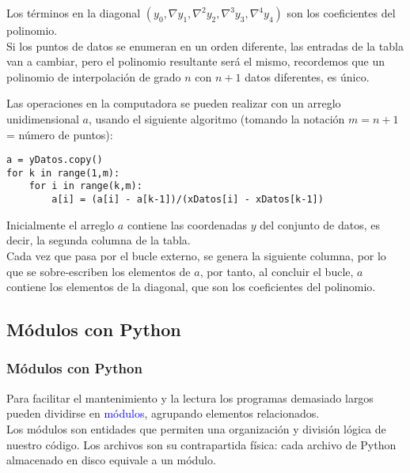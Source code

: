 \begin{frame}
Los términos en la diagonal $(y_{0}, \nabla y_{1}, \nabla^{2} y_{2}, \nabla^{3} y_{3}, \nabla^{4} y_{4})$ son los coeficientes del polinomio.
\\
\medskip
Si los puntos de datos se enumeran en un orden diferente, las entradas de la tabla van a cambiar, pero el polinomio resultante será el mismo, recordemos que un polinomio de interpolación de grado $n$ con $n + 1$ datos diferentes, es único.
\end{frame}
\begin{frame}[fragile]
Las operaciones en la computadora se pueden realizar con un arreglo unidimensional $a$, usando el siguiente algoritmo (tomando la notación $m = n + 1$ = número de puntos):
\\
\medskip
\begin{lstlisting}
a = yDatos.copy()
for k in range(1,m):
    for i in range(k,m):
        a[i] = (a[i] - a[k-1])/(xDatos[i] - xDatos[k-1])
\end{lstlisting}
\end{frame}
\begin{frame}
Inicialmente el arreglo $a$ contiene las coordenadas $y$ del conjunto de datos, es decir, la segunda columna de la tabla.
\\
\medskip
Cada vez que pasa por el bucle externo, se genera la siguiente columna, por lo que se sobre-escriben los elementos de $a$, por tanto, al concluir el bucle, $a$ contiene los elementos de la diagonal, que son los coeficientes del polinomio.
\end{frame}
\subsection{Módulos con Python}
\begin{frame}
\frametitle{Módulos con Python}
Para facilitar el mantenimiento y la lectura los programas demasiado largos pueden dividirse en \textcolor{blue}{módulos}, agrupando elementos relacionados.
\\
\bigskip
Los módulos son entidades que permiten una organización y división lógica de nuestro código. Los archivos son su contrapartida física: cada archivo de Python almacenado en disco equivale a un módulo.
\end{frame}
